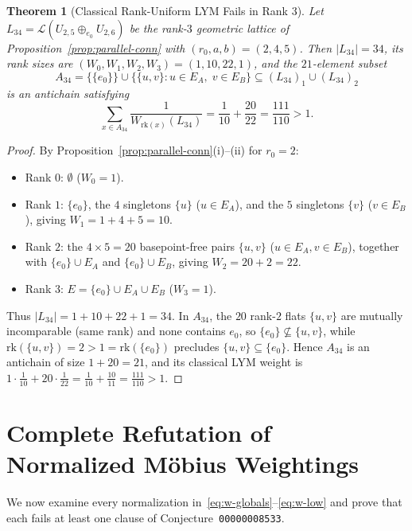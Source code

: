 \documentclass[11pt]{article}
\newtheorem{theorem}{Theorem}[section]
\theoremstyle{definition}
\theoremstyle{remark}
\newcommand{\rk}{\mathrm{rk}}
\begin{document}
\begin{theorem}[Classical Rank-Uniform LYM Fails in Rank $3$]\label{thm:L34}
Let $L_{34} = \mathcal{L}(U_{2,5} \oplus_{e_0} U_{2,6})$ be the rank-$3$ geometric lattice of Proposition~\ref{prop:parallel-conn} with $(r_0, a, b) = (2, 4, 5)$. Then $|L_{34}| = 34$, its rank sizes are $(W_0, W_1, W_2, W_3) = (1, 10, 22, 1)$, and the $21$-element subset
\[
  A_{34} = \bigl\{\{e_0\}\bigr\} \cup \bigl\{\{u, v\} : u \in E_A,\; v \in E_B\bigr\} \subseteq (L_{34})_1 \cup (L_{34})_2
\]
is an antichain satisfying
\begin{equation}\label{eq:L34-violation}
  \sum_{x \in A_{34}} \frac{1}{W_{\rk(x)}(L_{34})} = \frac{1}{10} + \frac{20}{22} = \frac{111}{110} > 1.
\end{equation}
\end{theorem}
\begin{proof}
By Proposition~\ref{prop:parallel-conn}(i)--(ii) for $r_0 = 2$:
\begin{itemize}
\item Rank $0$: $\emptyset$ ($W_0 = 1$).
\item Rank $1$: $\{e_0\}$, the $4$ singletons $\{u\}$ ($u \in E_A$), and the $5$ singletons $\{v\}$ ($v \in E_B$), giving $W_1 = 1 + 4 + 5 = 10$.
\item Rank $2$: the $4 \times 5 = 20$ basepoint-free pairs $\{u, v\}$ ($u \in E_A, v \in E_B$), together with $\{e_0\} \cup E_A$ and $\{e_0\} \cup E_B$, giving $W_2 = 20 + 2 = 22$.
\item Rank $3$: $E = \{e_0\} \cup E_A \cup E_B$ ($W_3 = 1$).
\end{itemize}
Thus $|L_{34}| = 1 + 10 + 22 + 1 = 34$. In $A_{34}$, the $20$ rank-$2$ flats $\{u, v\}$ are mutually incomparable (same rank) and none contains $e_0$, so $\{e_0\} \not\subseteq \{u, v\}$, while $\rk(\{u, v\}) = 2 > 1 = \rk(\{e_0\})$ precludes $\{u, v\} \subseteq \{e_0\}$. Hence $A_{34}$ is an antichain of size $1 + 20 = 21$, and its classical LYM weight is $1 \cdot \frac{1}{10} + 20 \cdot \frac{1}{22} = \frac{1}{10} + \frac{10}{11} = \frac{111}{110} > 1$.
\end{proof}

\section{Complete Refutation of Normalized M\"obius Weightings}

We now examine every normalization in~\eqref{eq:w-globals}--\eqref{eq:w-low} and prove that each fails at least one clause of Conjecture~\texttt{00000008533}.
\end{document}
